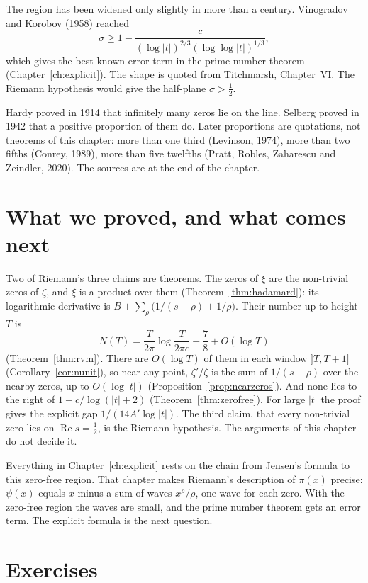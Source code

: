 \begin{remark}
The region has been widened only slightly in more than a century. Vinogradov and Korobov (1958) reached
\[
\sigma\ge1-\frac c{(\log|t|)^{2/3}(\log\log|t|)^{1/3}},
\]
which gives the best known error term in the prime number theorem (Chapter~\ref{ch:explicit}). The shape is quoted from Titchmarsh, Chapter~VI. The Riemann hypothesis would give the half-plane $\sigma>\frac12$.

Hardy proved in 1914 that infinitely many zeros lie on the line. Selberg proved in 1942 that a positive proportion of them do. Later proportions are quotations, not theorems of this chapter: more than one third (Levinson, 1974), more than two fifths (Conrey, 1989), more than five twelfths (Pratt, Robles, Zaharescu and Zeindler, 2020). The sources are at the end of the chapter.
\end{remark}

\section{What we proved, and what comes next}

Two of Riemann's three claims are theorems. The zeros of $\xi$ are the non-trivial zeros of $\zeta$, and $\xi$ is a product over them (Theorem~\ref{thm:hadamard}): its logarithmic derivative is $B+\sum_\rho\bigl(1/(s-\rho)+1/\rho\bigr)$. Their number up to height $T$ is
\[
N(T)=\frac T{2\pi}\log\frac T{2\pi e}+\frac78+O(\log T)
\]
(Theorem~\ref{thm:rvm}). There are $O(\log T)$ of them in each window $]T,T+1]$ (Corollary~\ref{cor:nunit}), so near any point, $\zeta'/\zeta$ is the sum of $1/(s-\rho)$ over the nearby zeros, up to $O(\log|t|)$ (Proposition~\ref{prop:nearzeros}). And none lies to the right of $1-c/\log(|t|+2)$ (Theorem~\ref{thm:zerofree}). For large $|t|$ the proof gives the explicit gap $1/(14A'\log|t|)$. The third claim, that every non-trivial zero lies on $\operatorname{Re}s=\frac12$, is the Riemann hypothesis. The arguments of this chapter do not decide it.

Everything in Chapter~\ref{ch:explicit} rests on the chain from Jensen's formula to this zero-free region. That chapter makes Riemann's description of $\pi(x)$ precise: $\psi(x)$ equals $x$ minus a sum of waves $x^\rho/\rho$, one wave for each zero. With the zero-free region the waves are small, and the prime number theorem gets an error term. The explicit formula is the next question.

\section{Exercises}

